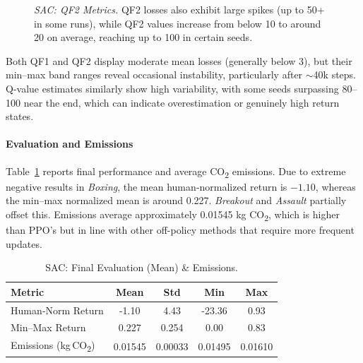 \begin{figure}
	\centering
	\quad
	\caption{\emph{SAC: QF2 Metrics.} QF2 losses also exhibit large spikes (up to 50+ in some runs), while QF2 values increase from below 10 to around 20 on average, reaching up to 100 in certain seeds.}
	\label{fig:sac_q_metrics_2}
\end{figure}

\noindent
Both QF1 and QF2 display moderate mean losses (generally below 3), but their min–max band ranges reveal occasional instability, particularly after \(\sim\)40k steps. Q-value estimates similarly show high variability, with some seeds surpassing 80–100 near the end, which can indicate overestimation or genuinely high return states.

\paragraph{Evaluation and Emissions}
Table~\ref{tab:sac_eval} reports final performance and average CO\textsubscript{2} emissions. Due to extreme negative results in \emph{Boxing}, the mean human‐normalized return is \(-1.10\), whereas the min–max normalized mean is around 0.227. \emph{Breakout} and \emph{Assault} partially offset this. Emissions average approximately 0.01545 kg CO\textsubscript{2}, which is higher than PPO's but in line with other off-policy methods that require more frequent updates.

\begin{table}
	\centering
	\caption{SAC: Final Evaluation (Mean) \& Emissions.}
	\label{tab:sac_eval}
	\begin{tabular}{lcccc}
		\toprule
		\textbf{Metric} & \textbf{Mean} & \textbf{Std} & \textbf{Min} & \textbf{Max} \\
		\midrule
		Human‐Norm Return & -1.10 & 4.43 & -23.36 & 0.93 \\
		Min–Max Return   & 0.227 & 0.254 & 0.00   & 0.83 \\
		Emissions (kg\,CO\textsubscript{2}) & 0.01545 & 0.00033 & 0.01495 & 0.01610 \\
		\bottomrule
	\end{tabular}
\end{table}

